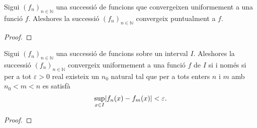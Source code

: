 \documentclass[../../Main.tex]{subfiles}
\begin{document}
	\begin{proposition}
		\label{prop:una successió de funcions convergeix uniformement a una funció a la que convergeixi puntualment}
		Sigui \((f_{n})_{n\in\mathbb{N}}\) una successió de funcions que convergeixen uniformement a una funció \(f\). Aleshores la successió \((f_{n})_{n\in\mathbb{N}}\) convergeix puntualment a \(f\).
		\begin{proof}
		\end{proof}
	\end{proposition}
	\begin{theorem}
		\label{thm:condició de Cauchy per successions de funcions}
		Sigui \((f_{n})_{n\in\mathbb{N}}\) una successió de funcions sobre un interval \(I\). Aleshores la successió \((f_{n})_{n\in\mathbb{N}}\) convergeix uniformement a una funció \(f\) de \(I\) si i només si per a tot \(\varepsilon>0\) real existeix un \(n_{0}\) natural tal que per a tots enters \(n\) i \(m\) amb \(n_{0}<m<n\) es satisfà
		\[\sup_{x\in I}\abs{f_{n}(x)-f_{m}(x)}<\varepsilon.\]
		\begin{proof}
		\end{proof}
	\end{theorem}
\end{document}

